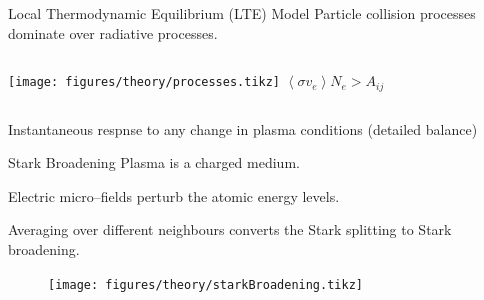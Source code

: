 \documentclass[dvipsnames]{beamer}
\begin{document}
\begin{frame}{Local Thermodynamic Equilibrium (LTE) Model}
  Particle collision processes dominate over radiative processes.
  \begin{columns}
    \texttt{[image: figures/theory/processes.tikz]}
   $\left<\sigma v_e \right> N_e > A_{ij}$
  \end{columns}


  Instantaneous respnse to any change in plasma conditions (detailed balance)
\end{frame}

\begin{frame}{Stark Broadening}
  Plasma is a charged medium.

  Electric micro--fields perturb the atomic energy levels.

  Averaging over different neighbours converts the Stark splitting to Stark broadening.
  \begin{figure}
  \texttt{[image: figures/theory/starkBroadening.tikz]}
  \end{figure}
\end{frame}
\end{document}
